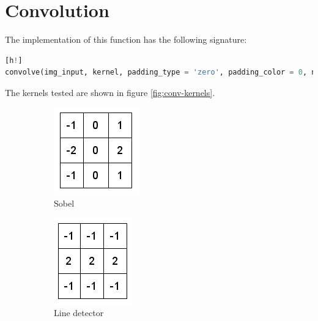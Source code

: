 \section{Convolution}

The implementation of this function has the following signature:

\begin{lstlisting}[language=python][h!]
convolve(img_input, kernel, padding_type = 'zero', padding_color = 0, normalize = False):
\end{lstlisting}

The kernels tested are shown in figure \ref{fig:conv-kernels}.
 
\begin{figure}[h!]
\centering
\begin{subfigure}{0.3\textwidth}
  \centering
  \includegraphics[width=0.5\linewidth]{figs/sobel.png}
  \caption{Sobel}
\end{subfigure}%
\begin{subfigure}{0.3\textwidth}
  \centering
  \includegraphics[width=0.5\linewidth]{figs/line.png}
  \caption{Line detector}
\end{subfigure}%
\begin{subfigure}{0.3\textwidth}

\end{subfigure}
\end{figure}

